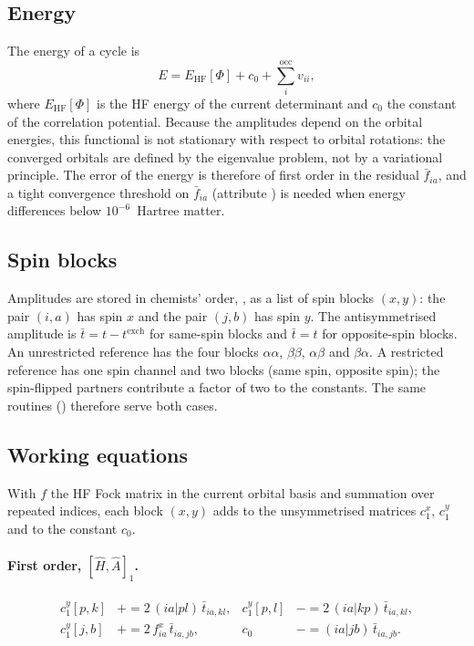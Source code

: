 \subsection{Energy}

The energy of a cycle is
\begin{equation}
  E = E_{\mathrm{HF}}[\Phi] + c_0 + \sum_{i}^{\mathrm{occ}} v_{ii},
  \label{eq:energy}
\end{equation}
where $E_{\mathrm{HF}}[\Phi]$ is the HF energy of the current determinant and
$c_0$ the constant of the correlation potential. Because the amplitudes
depend on the orbital energies, this functional is not stationary with respect
to orbital rotations: the converged orbitals are defined by the eigenvalue
problem, not by a variational principle. The error of the energy is therefore
of first order in the residual $\bar f_{ia}$, and a tight convergence
threshold on $\bar f_{ia}$ (attribute ) is needed when
energy differences below $10^{-6}$~Hartree matter.

\subsection{Spin blocks}

Amplitudes are stored in chemists' order, , as a list of
spin blocks $(x,y)$: the pair $(i,a)$ has spin $x$ and the pair $(j,b)$ has
spin $y$. The antisymmetrised amplitude is $\bar t = t - t^{\mathrm{exch}}$
for same-spin blocks and $\bar t = t$ for opposite-spin blocks. An
unrestricted reference has the four blocks $\alpha\alpha$, $\beta\beta$,
$\alpha\beta$ and $\beta\alpha$. A restricted reference has one spin channel
and two blocks (same spin, opposite spin); the spin-flipped partners
contribute a factor of two to the constants. The same routines
() therefore serve both cases.

\subsection{Working equations}

With $f$ the HF Fock matrix in the current orbital basis and summation over
repeated indices, each block $(x,y)$ adds to the unsymmetrised matrices
$c_1^{x}$, $c_1^{y}$ and to the constant $c_0$.

\paragraph{First order, $[\hat H,\hat A]_1$.}
\begin{align}
  c_1^{y}[p,k] &\mathrel{+}= 2\,(ia|pl)\,\bar t_{ia,kl}, &
  c_1^{y}[p,l] &\mathrel{-}= 2\,(ia|kp)\,\bar t_{ia,kl}, \\
  c_1^{y}[j,b] &\mathrel{+}= 2\,f^{x}_{ia}\,\bar t_{ia,jb}, &
  c_0 &\mathrel{-}= (ia|jb)\,\bar t_{ia,jb}.
\end{align}


